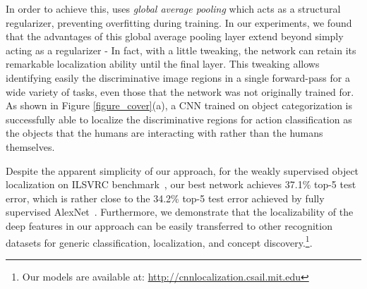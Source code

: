 \documentclass[10pt,twocolumn,letterpaper]{article}
\begin{document}
In order to achieve this, \cite{lin2013network} uses \textit{global average pooling} which acts as a structural regularizer, preventing overfitting during training. In our experiments, we found that the advantages of this global average pooling layer extend beyond simply acting as a regularizer - In fact, with a little tweaking, the network can retain its remarkable localization ability until the final layer. This tweaking allows identifying easily the discriminative image regions in a single forward-pass for a wide variety of tasks, even those that the network was not originally trained for. As shown in Figure \ref{figure_cover}(a), a CNN trained on object categorization is successfully able to localize the discriminative regions for action classification as the objects that the humans are interacting with rather than the humans themselves. %


Despite the apparent simplicity of our approach, for the weakly supervised object localization on ILSVRC benchmark~\cite{ILSVRCijcv15}, our best network achieves 37.1\% top-5 test error, which is rather close to the 34.2\% top-5 test error achieved by fully supervised AlexNet~\cite{krizhevsky2012imagenet}. Furthermore, we demonstrate that the localizability of the deep features in our approach can be easily transferred to other recognition datasets for generic classification, localization, and concept discovery.\footnote{Our models are available at: \href{http://cnnlocalization.csail.mit.edu}{http://cnnlocalization.csail.mit.edu}}.


\end{document}
